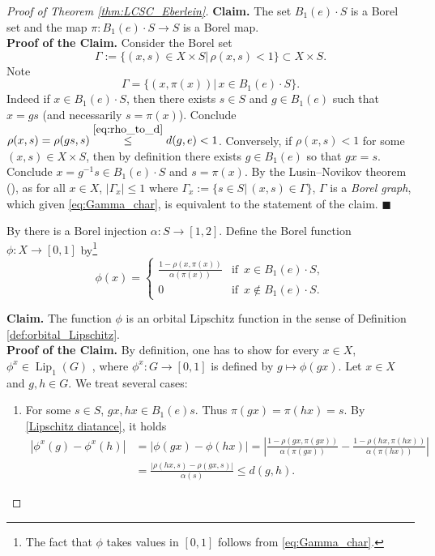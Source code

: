 \documentclass[11pt]{article}
\theoremstyle{plain}
\theoremstyle{definition}
\DeclareMathOperator{\Lip}{Lip}
\numberwithin{figure}{section}
\begin{document}
\begin{proof}[Proof of Theorem \ref{thm:LCSC_Eberlein}]
      \noindent
  \textbf{Claim.} The set $B_1(e)\cdot S$ is a Borel set and the map $\pi:B_1(e)\cdot S\rightarrow S$ is a Borel map.\\
   \noindent
 \textbf{Proof of the Claim.} Consider the Borel set 
  $$\Gamma:=\{(x,s)\in X\times S|\,\rho(x,s)<1\}\subset X\times S.$$
  Note
  \begin{equation}\label{eq:Gamma_char}
  \Gamma=\{(x,\pi(x))|\,x\in B_1(e)\cdot S\}.       \end{equation}
 Indeed if 
 $x\in B_1(e)\cdot S$, then  there exists $s\in S$ and $g\in B_1(e)$ such that $x = gs$ (and necessarily $s=\pi(x)$). Conclude $\rho(x,s) = \rho(gs,s) \stackrel{\eqref{eq:rho_to_d}}{\leq}  d(g,e) < 1$. Conversely, if $\rho(x,s)<1$ for some $(x,s)\in X\times S$, then by definition there exists $g\in B_1(e)$ so that $gx=s$. Conclude $x=g^{-1}s\in B_1(e)\cdot S$ and $s=\pi(x)$. By the Lusin–Novikov theorem (\cite[Theorem 18.10]{Kec95}), as for all $x\in X$, $|\Gamma_x|\leq 1$ where $\Gamma_x:=\{s\in S|\, (x,s)\in \Gamma\}$, $\Gamma$ is a \textit{Borel graph}, which given \eqref{eq:Gamma_char}, is equivalent to the statement of the claim.  \hfill  $\blacksquare$



  
    By \cite[Theorem 15.6]{Kec95} there is a Borel injection $\alpha: S\to[1,2]$. Define the Borel function $\phi:X\to[0,1]$ by\footnote{The fact that $\phi$ takes values in $[0,1]$ follows from \eqref{eq:Gamma_char}.}
     \begin{equation*}
         \phi(x)=
         \begin{cases}
         \frac{1-\rho(x,\pi(x))}{\alpha(\pi(x))} & \textrm{if }\, x\in B_1(e)\cdot S,\\
         0   &    \textrm{if }\, x\notin B_1(e)\cdot S.
       \end{cases}
     \end{equation*}
      
      \noindent
      \textbf{Claim.} The function $\phi$ is an orbital Lipschitz function in the sense of Definition  \ref{def:orbital_Lipschitz}.\\
      \textbf{Proof of the Claim.} By definition, one has to show for every $x\in X$, $\phi^x\in\Lip_1(G)$ , where $\phi^x:G\to[0,1]$ is defined by $g\mapsto \phi(gx)$.           
      Let $x\in X$ and $g,h\in G$. We treat several cases:
      \begin{enumerate}
          \item 
      For some $s\in S$, $gx,hx\in B_1(e) s$. Thus $\pi(gx)=\pi(hx)=s$. By \eqref{Lipschitz diatance}, it holds
      \begin{equation*}
          \begin{split}
              |\phi^x(g)-\phi^x(h)|&=|\phi(gx)-\phi(hx)|=\left|\frac{1-\rho(gx,\pi(gx))}{\alpha(\pi(gx))}-\frac{1-\rho(hx,\pi(hx))}{\alpha(\pi(hx))}\right|\\
              &=\frac{|\rho(hx,s)-\rho(gx,s)|}{\alpha(s)}\leq d(g,h).
          \end{split}
      \end{equation*}
     

\end{enumerate}
\end{proof}
\end{document}
